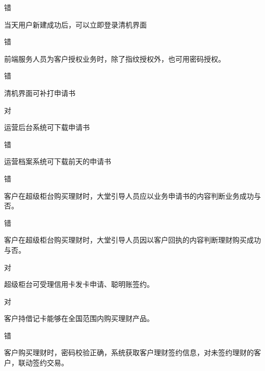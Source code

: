 \documentclass[kindlepaper]{BHCexam4kindle}
\begin{document}
\begin{questions}
\begin{solution} 错 \end{solution}
\qs 当天用户新建成功后，可以立即登录清机界面 \xx
\begin{solution} 错 \end{solution}
\qs 前端服务人员为客户授权业务时，除了指纹授权外，也可用密码授权。 \xx
\begin{solution} 错 \end{solution}
\qs 清机界面可补打申请书 \xx
\begin{solution} 对 \end{solution}
\qs 运营后台系统可下载申请书 \xx
\begin{solution} 错 \end{solution}
\qs 运营档案系统可下载前天的申请书 \xx
\begin{solution} 错 \end{solution}
\qs 客户在超级柜台购买理财时，大堂引导人员应以业务申请书的内容判断业务成功与否。 \xx
\begin{solution} 错 \end{solution}
\qs 客户在超级柜台购买理财时，大堂引导人员因以客户回执的内容判断理财购买成功与否。 \xx
\begin{solution} 对 \end{solution}
\qs 超级柜台可受理信用卡发卡申请、聪明账签约。 \xx
\begin{solution} 对 \end{solution}
\qs 客户持借记卡能够在全国范围内购买理财产品。 \xx
\begin{solution} 错 \end{solution}
\qs 客户购买理财时，密码校验正确，系统获取客户理财签约信息，对未签约理财的客户，联动签约交易。 \xx

\end{questions}
\end{document}
